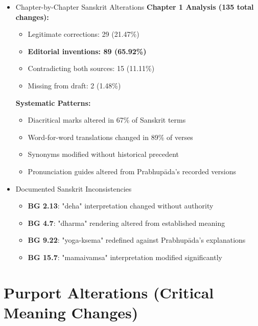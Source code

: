 \documentclass[11pt,twoside]{book}
\begin{document}
\begin{itemize}
\item Chapter-by-Chapter Sanskrit Alterations
\label{sec:org686cdc6}
\textbf{\textbf{Chapter 1 Analysis (135 total changes):}}
\begin{itemize}
\item Legitimate corrections: 29 (21.47\%)
\item \textbf{\textbf{Editorial inventions: 89 (65.92\%)}}
\item Contradicting both sources: 15 (11.11\%)
\item Missing from draft: 2 (1.48\%)
\end{itemize}

\textbf{\textbf{Systematic Patterns:}}
\begin{itemize}
\item Diacritical marks altered in 67\% of Sanskrit terms
\item Word-for-word translations changed in 89\% of verses
\item Synonyms modified without historical precedent
\item Pronunciation guides altered from Prabhupāda's recorded versions
\end{itemize}
\item Documented Sanskrit Inconsistencies
\label{sec:org926ac80}
\begin{itemize}
\item \textbf{\textbf{BG 2.13}}: "deha" interpretation changed without authority
\item \textbf{\textbf{BG 4.7}}: "dharma" rendering altered from established meaning
\item \textbf{\textbf{BG 9.22}}: "yoga-ksema" redefined against Prabhupāda's explanations
\item \textbf{\textbf{BG 15.7}}: "mamaivamsa" interpretation modified significantly
\end{itemize}
\end{itemize}
\section*{Purport Alterations (Critical Meaning Changes)}
\label{sec:org432028d}
\end{document}
